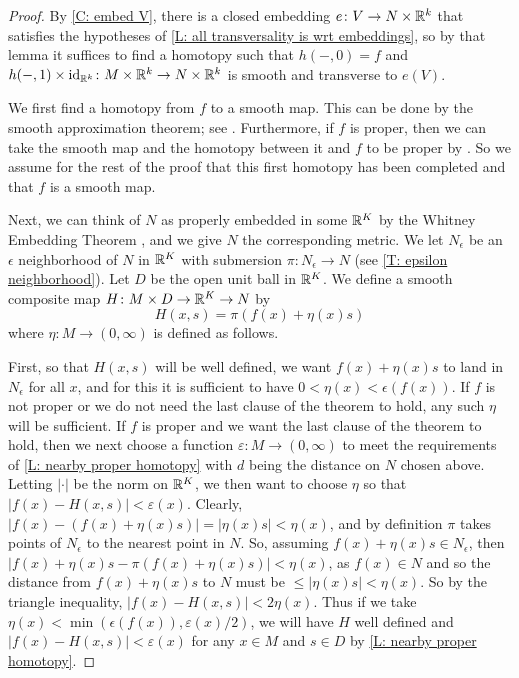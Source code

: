 \begin{proof}
	By \cref{C: embed V}, there is a closed embedding $e \colon V \to N \times \mathbb{R}^k$ that satisfies the hypotheses of \cref{L: all transversality is wrt embeddings}, so by that lemma it suffices to find a homotopy such that $h(-,0) = f$ and $h(-,1) \times \mathrm{id}_{\mathbb{R}^k} \colon M \times \mathbb{R}^k \to N \times \mathbb{R}^k$ is smooth and transverse to $e(V)$.

	We first find a homotopy from $f$ to a smooth map.
	This can be done by the smooth approximation theorem; see \cite[Corollary 9.2.31]{MaDo92}.
	Furthermore, if $f$ is proper, then we can take the smooth map and the homotopy between it and $f$ to be proper by \cite[Corollary 9.2.36]{MaDo92}.
	So we assume for the rest of the proof that this first homotopy has been completed and that $f$ is a smooth map.
	\begin{comment}
	We will next construct our homotopy to achieve transversality without consideration of whether or not $f$ is already transverse to $g$ on $\bd M$, and then we show how to modify the construction for that case.
	\end{comment}

	Next, we can think of $N$ as properly embedded in some $\mathbb{R}^K$ by the Whitney Embedding Theorem \cite[Section 1.8]{GuPo74}, and we give $N$ the corresponding metric.
	We let $N_\epsilon$ be an $\epsilon$ neighborhood of $N$ in $\mathbb{R}^K$ with submersion $\pi \colon N_\epsilon \to N$ (see \cref{T: epsilon neighborhood}).
	Let $D$ be the open unit ball in $\mathbb{R}^K$.
	We define a smooth composite map $H \colon M \times D \to \mathbb{R}^K \to N$ by
	$$H(x,s) = \pi(f(x)+ \eta(x)s)$$
	where $\eta \colon M \to (0,\infty)$ is defined as follows.

	First, so that $H(x,s)$ will be well defined, we want $f(x)+ \eta(x)s$ to land in $N_\epsilon$ for all $x$, and for this it is sufficient to have $0< \eta(x) < \epsilon(f(x))$.
	If $f$ is not proper or we do not need the last clause of the theorem to hold, any such $\eta$ will be sufficient.
	If $f$ is proper and we want the last clause of the theorem to hold, then we next choose a function $\varepsilon \colon M \to (0,\infty)$ to meet the requirements of \cref{L: nearby proper homotopy} with $d$ being the distance on $N$ chosen above.
	Letting $|\cdot|$ be the norm on $\mathbb{R}^K$, we then want to choose $\eta$ so that $|f(x) - H(x,s)| < \varepsilon(x)$.
	Clearly, $|f(x) - (f(x)+ \eta(x)s)| = |\eta(x)s| < \eta(x)$, and by definition $\pi$ takes points of $N_\epsilon$ to the nearest point in $N$. So, assuming $f(x)+ \eta(x)s \in N_\epsilon$, then $|f(x)+ \eta(x)s - \pi(f(x)+ \eta(x)s)| < \eta(x)$, as $f(x) \in N$ and so the distance from $f(x)+ \eta(x)s$ to $N$ must be $\leq |\eta(x)s| < \eta(x)$.
	So by the triangle inequality, $|f(x) - H(x,s)| < 2\eta(x)$.
	Thus if we take $\eta(x) < \min(\epsilon(f(x)), \varepsilon(x)/2)$, we will have $H$ well defined and $|f(x) - H(x,s)| < \varepsilon(x)$ for any $x \in M$ and $s \in D$ by \cref{L: nearby proper homotopy}.


\end{proof}
